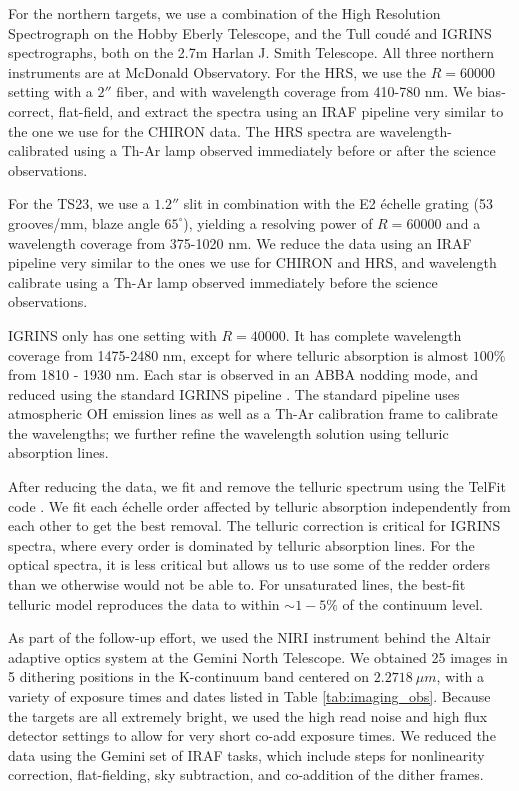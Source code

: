 \documentclass{emulateapj}
\begin{document}
For the northern targets, we use a combination of the High Resolution Spectrograph \citep[HRS,][]{HRS} on the Hobby Eberly Telescope, and the Tull coud\'e \citep[TS23,][]{TS23} and IGRINS \citep{IGRINS} spectrographs, both on the 2.7m Harlan J. Smith Telescope. All three northern instruments are at McDonald Observatory. For the HRS, we use the $R = 60000$ setting with a $2''$ fiber, and with wavelength coverage from 410-780 nm. We bias-correct, flat-field, and extract the spectra using an IRAF pipeline very similar to the one we use for the CHIRON data. The HRS spectra are wavelength-calibrated using a Th-Ar lamp observed immediately before or after the science observations.

For the TS23, we use a $1.2''$ slit in combination with the E2 \'echelle grating (53 grooves/mm, blaze angle $65^{\circ}$), yielding a resolving power of $R=60000$ and a wavelength coverage from 375-1020 nm. We reduce the data using an IRAF pipeline very similar to the ones we use for CHIRON and HRS, and wavelength calibrate using a Th-Ar lamp observed immediately before the science observations.

IGRINS only has one setting with $R = 40000$. It has complete wavelength coverage from 1475-2480 nm, except for where telluric absorption is almost $100\%$ from 1810 - 1930 nm. Each star is observed in an ABBA nodding mode, and reduced using the standard IGRINS pipeline \citep{IGRINS_plp_v2}. The standard pipeline uses atmospheric OH emission lines as well as a Th-Ar calibration frame to calibrate the wavelengths; we further refine the wavelength solution using telluric absorption lines.

After reducing the data, we fit and remove the telluric spectrum using the TelFit code \citep{Gullikson2014}. We fit each \'echelle order affected by telluric absorption independently from each other to get the best removal. The telluric correction is critical for IGRINS spectra, where every order is dominated by telluric absorption lines. For the optical spectra, it is less critical but allows us to use some of the redder orders than we otherwise would not be able to. For unsaturated lines, the best-fit telluric model reproduces the data to within $\sim 1-5\%$ of the continuum level.

As part of the follow-up effort, we used the NIRI instrument behind the Altair adaptive optics system at the Gemini North Telescope. We obtained 25 images in 5 dithering positions in the K-continuum band centered on $2.2718\ \mu m$, with a variety of exposure times and dates listed in Table \ref{tab:imaging_obs}. Because the targets are all extremely bright, we used the high read noise and high flux detector settings to allow for very short co-add exposure times. We reduced the data using the Gemini set of IRAF tasks, which include steps for nonlinearity correction, flat-fielding, sky subtraction, and co-addition of the dither frames.
\end{document}
